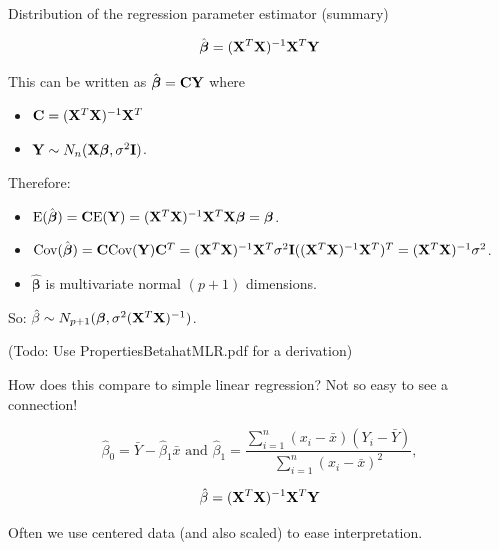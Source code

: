 \documentclass[10pt,ignorenonframetext,]{beamer}
\providecommand{\tightlist}{%
  \setlength{\itemsep}{0pt}\setlength{\parskip}{0pt}}
\begin{document}
\begin{frame}

\begin{block}{Distribution of the regression parameter estimator
(summary)}

\[ \hat{\boldsymbol\beta}=({\bf X}^T{\bf X})^{-1} {\bf X}^T {\bf Y}\]

This can be written as \(\hat{\boldsymbol\beta}={\bf C}{\bf Y}\) where

\begin{itemize}
\tightlist
\item
  \({\bf C}=({\bf X}^T{\bf X})^{-1} {\bf X}^T\)
\item
  \({\bf Y} \sim N_{n}({\bf X} {\boldsymbol\beta},\sigma^2 {\bf I})\).
\end{itemize}

Therefore:

\begin{itemize}
\tightlist
\item
  \(\text{E}(\hat{\boldsymbol\beta})={\bf C}\text{E}({\bf Y})=({\bf X}^T{\bf X})^{-1} {\bf X}^T{\bf X} {\boldsymbol\beta}={\boldsymbol\beta}\).
\item
  \(\text{Cov}(\hat{\boldsymbol\beta})={\bf C}\text{Cov}({\bf Y}){\bf C}^T=({\bf X}^T{\bf X})^{-1} {\bf X}^T \sigma^2 {\bf I}(({\bf X}^T{\bf X})^{-1} {\bf X}^T)^T =({\bf X}^T{\bf X})^{-1} \sigma^2\).
\item
  \(\hat{\boldsymbol\beta}\) is multivariate normal \((p+1)\)
  dimensions.
\end{itemize}

So:
\(\hat{\beta}\sim N_{p+1}(\boldsymbol{\beta},\sigma^2({\bf X}^T{\bf X})^{-1})\).

(Todo: Use PropertiesBetahatMLR.pdf for a derivation)

\end{block}

\end{frame}

\begin{frame}

How does this compare to simple linear regression? Not so easy to see a
connection!

\[\hat{\beta}_0 = \bar{Y}-\hat{\beta}_1 \bar{x} \text{ and } \hat{\beta}_1 = \frac{\sum_{i=1}^n(x_i-\bar{x})(Y_i-\bar{Y})}{\sum_{i=1}^n(x_i-\bar{x})^2},\]

\[ \hat\beta=({\bf X}^T{\bf X})^{-1} {\bf X}^T {\bf Y}\]

Often we use centered data (and also scaled) to ease interpretation.

\end{frame}
\end{document}
